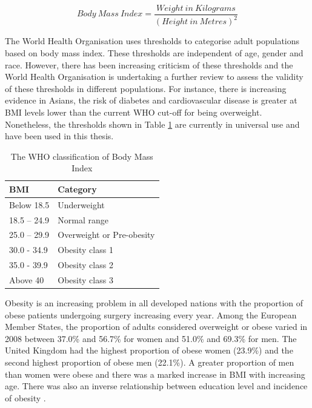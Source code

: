 \begin{equation} \label{eq:bmi}
Body\ Mass\ Index = \frac{Weight\ in\ Kilograms}{(Height\ in\ Metres)^2}
\end{equation}

The World Health Organisation uses thresholds to categorise adult populations based on body mass index. 
These thresholds are independent of age, gender and race. 
However, there has been increasing criticism of these thresholds and the World Health Organisation is undertaking a further review to assess the validity of these thresholds in different populations. 
For instance, there is increasing evidence in Asians, the risk of diabetes and cardiovascular disease is greater at BMI levels lower than the current WHO cut-off for being overweight. 
Nonetheless, the thresholds shown in Table \ref{table:bmi_who} are currently in universal use and have been used in this thesis.

\begin{table}[h]
	\centering
	\caption{The WHO classification of Body Mass Index}
	\label{table:bmi_who}
	\renewcommand{\arraystretch}{1.5} %
	\begin{tabular}{|l l|}
		\hline
		BMI     & Category         \\ \hline
		Below 18.5 & Underweight        \\
		18.5 – 24.9 & Normal range       \\
		25.0 – 29.9 & Overweight or Pre-obesity \\
		30.0 - 34.9 & Obesity class 1       \\
		35.0 - 39.9 & Obesity class 2       \\
		Above 40  & Obesity class 3       \\ \hline
	\end{tabular}
\end{table}

Obesity is an increasing problem in all developed nations with the proportion of obese patients undergoing surgery increasing every year. 
Among the European Member States, the proportion of adults considered overweight or obese varied in 2008 between 37.0\% and 56.7\% for women and 51.0\% and 69.3\% for men. 
The United Kingdom had the highest proportion of obese women (23.9\%) and the second highest proportion of obese men (22.1\%). 
A greater proportion of men than women were obese and there was a marked increase in BMI with increasing age. 
There was also an inverse relationship between education level and incidence of obesity \parencite{who_obesity:_2000}.

